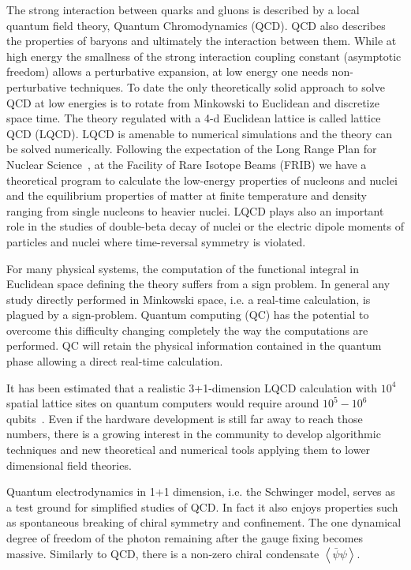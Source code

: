 \documentclass[10pt]{article}
\begin{document}
The strong interaction between quarks and gluons is
described by a local quantum field theory, Quantum Chromodynamics (QCD).
QCD also describes the properties of baryons and ultimately the interaction between them.
While at high energy the smallness of the
strong interaction coupling constant (asymptotic freedom) allows a perturbative
expansion, at low energy one needs non-perturbative techniques.
To date the only theoretically solid approach to solve QCD at low energies
is to rotate from Minkowski to Euclidean and discretize space time.
The theory regulated with a 4-d Euclidean lattice is called lattice QCD (LQCD).
LQCD is amenable to numerical simulations and the theory can be solved numerically.
Following the expectation of the Long Range Plan for Nuclear Science~\cite{Geesaman:2015fha},
at the Facility of Rare Isotope Beams (FRIB) we have a theoretical program
to calculate the low-energy properties of nucleons and nuclei and the equilibrium properties
of matter at finite temperature and density ranging from single nucleons to heavier nuclei.
LQCD plays also an important role in the studies of double-beta decay of nuclei
or the electric dipole moments of particles and nuclei
where time-reversal symmetry is violated.

For many physical systems, the computation of the
functional integral in Euclidean space defining the theory
suffers from a sign problem. In general any study directly
performed in Minkowski space, i.e. a real-time calculation,
is plagued by a sign-problem.
Quantum computing (QC) has the potential to overcome this difficulty
changing completely the way the computations are performed.
QC will retain the physical information contained in the quantum phase
allowing a direct real-time calculation.

It has been estimated that a realistic 3+1-dimension LQCD calculation with $10^4$ spatial lattice sites on quantum computers
would require around $10^5 - 10^6$ qubits~\cite{Byrnes:2005qx}. 
Even if the hardware development is still
far away to reach those numbers, there is a growing interest in the community
to develop algorithmic techniques and new theoretical and numerical tools applying them
to lower dimensional field theories.

Quantum electrodynamics in 1+1 dimension, i.e. the Schwinger model,
serves as a test ground for simplified studies of QCD.
In fact it also enjoys properties such as
spontaneous breaking of chiral symmetry and confinement.
The one dynamical degree of freedom of the photon remaining
after the gauge fixing becomes massive.
Similarly to QCD, there is a non-zero
chiral condensate $\left\langle \bar\psi \psi \right\rangle$.
\end{document}
